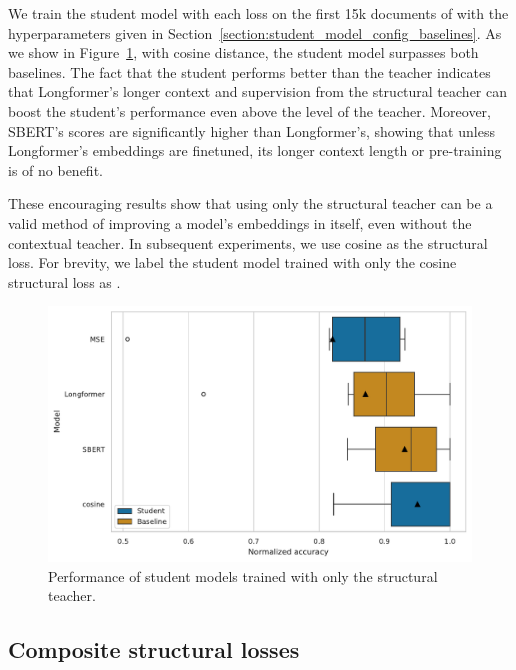 We train the student model with each loss on the first 15k documents of
 with the hyperparameters given in
Section~\ref{section:student_model_config_baselines}. As we show in
Figure~\ref{fig:structural_basic}, with cosine distance, the student model
surpasses both baselines. The fact that the student performs better
than the teacher indicates that Longformer's longer context and supervision from
the structural teacher can boost the student's performance even above the level
of the teacher. Moreover, SBERT's scores are significantly higher than
Longformer's, showing that unless Longformer's embeddings are finetuned, its
longer context length or pre-training is of no benefit.

These encouraging results show that using only the structural teacher can be a
valid method of improving a model's embeddings in itself, even without the contextual teacher. In subsequent experiments, we
use cosine as the structural loss. For brevity, we label the student model
trained with only the cosine structural loss as .

\begin{figure}
  \includegraphics[width=\textwidth]{img/structural_simple_losses.pdf}

  \caption{Performance of student models trained with only the structural
  teacher.}

  \label{fig:structural_basic}
\end{figure}

\subsection{Composite structural losses}\label{section:composite_losses}

